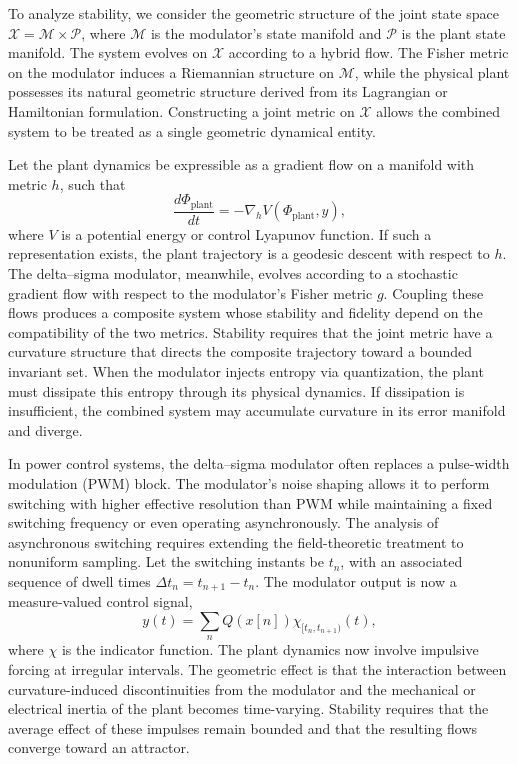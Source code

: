 To analyze stability, we consider the geometric structure of the joint state space \( \mathcal{X} = \mathcal{M} \times \mathcal{P} \), where \( \mathcal{M} \) is the modulator’s state manifold and \( \mathcal{P} \) is the plant state manifold. The system evolves on \( \mathcal{X} \) according to a hybrid flow. The Fisher metric on the modulator induces a Riemannian structure on \(\mathcal{M}\), while the physical plant possesses its natural geometric structure derived from its Lagrangian or Hamiltonian formulation. Constructing a joint metric on \( \mathcal{X} \) allows the combined system to be treated as a single geometric dynamical entity.

Let the plant dynamics be expressible as a gradient flow on a manifold with metric \(h\), such that
\[
\frac{d\Phi_{\mathrm{plant}}}{dt} = - \nabla_{h} V(\Phi_{\mathrm{plant}}, y),
\]
where \(V\) is a potential energy or control Lyapunov function. If such a representation exists, the plant trajectory is a geodesic descent with respect to \(h\). The delta–sigma modulator, meanwhile, evolves according to a stochastic gradient flow with respect to the modulator’s Fisher metric \(g\). Coupling these flows produces a composite system whose stability and fidelity depend on the compatibility of the two metrics. Stability requires that the joint metric have a curvature structure that directs the composite trajectory toward a bounded invariant set. When the modulator injects entropy via quantization, the plant must dissipate this entropy through its physical dynamics. If dissipation is insufficient, the combined system may accumulate curvature in its error manifold and diverge.

In power control systems, the delta–sigma modulator often replaces a pulse-width modulation (PWM) block. The modulator’s noise shaping allows it to perform switching with higher effective resolution than PWM while maintaining a fixed switching frequency or even operating asynchronously. The analysis of asynchronous switching requires extending the field-theoretic treatment to nonuniform sampling. Let the switching instants be \( t_{n} \), with an associated sequence of dwell times \( \Delta t_{n} = t_{n+1} - t_{n} \). The modulator output is now a measure-valued control signal,
\[
y(t) = \sum_{n} Q(x[n]) \chi_{[t_{n}, t_{n+1})}(t),
\]
where \( \chi \) is the indicator function. The plant dynamics now involve impulsive forcing at irregular intervals. The geometric effect is that the interaction between curvature-induced discontinuities from the modulator and the mechanical or electrical inertia of the plant becomes time-varying. Stability requires that the average effect of these impulses remain bounded and that the resulting flows converge toward an attractor.

